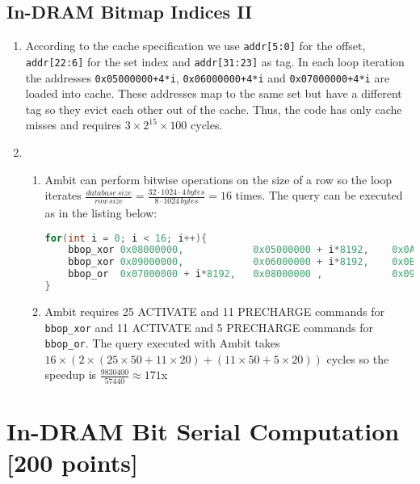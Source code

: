 \documentclass[a4paper]{article}
\begin{document}
\subsection{In-DRAM Bitmap Indices II}

\begin{enumerate}[label=\alph*)]
    \item According to the cache specification we use \verb|addr[5:0]| for the offset,
        \verb|addr[22:6]| for the set index and \verb|addr[31:23]| as tag. In each loop
        iteration the addresses \verb|0x05000000+4*i|, \verb|0x06000000+4*i| and 
        \verb|0x07000000+4*i| are loaded into cache. These addresses map to the same
        set but have a different tag so they evict each other out of the cache. Thus, the
        code has only cache misses and requires $3 \times 2^{15} \times 100$ cycles.

    \item 
        \begin{enumerate}[label=\roman*)]
            \item Ambit can perform bitwise operations on the size of a row so the loop
                iterates 
                $\frac{database \, size}{row \, size} = \frac{32 \cdot 1024 \cdot 4 \, bytes}{8 \cdot 1024 \, bytes} = 16$
                times. The query can be executed as in the listing below:
\begin{lstlisting}[language=c]
for(int i = 0; i < 16; i++){
    bbop_xor 0x08000000,            0x05000000 + i*8192,    0x0A000000
    bbop_xor 0x09000000,            0x06000000 + i*8192,    0x0B000000
    bbop_or  0x07000000 + i*8192,   0x08000000 ,            0x09000000
}
\end{lstlisting}

            \item Ambit requires 25 ACTIVATE and 11 PRECHARGE commands for \verb|bbop_xor| and
                11 ACTIVATE and 5 PRECHARGE commands for \verb|bbop_or|. The query executed with
                Ambit takes $16 \times (2 \times (25 \times 50 + 11 \times 20) + (11 \times 50 + 5 \times 20))$
                cycles so the speedup is $\frac{9830400}{57440}\approx 171$x
        \end{enumerate}
\end{enumerate}

\section{In-DRAM Bit Serial Computation [200 points]}
\end{document}
